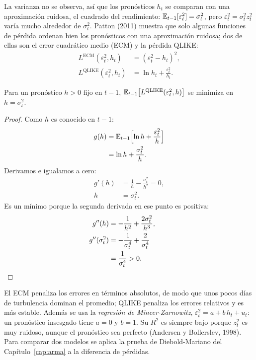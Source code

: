 La varianza no se observa, así que los pronósticos $h_t$ se comparan con una aproximación ruidosa, el cuadrado
del rendimiento: $\mathbb{E}_{t-1}[\varepsilon_t^2]=\sigma_t^2$, pero $\varepsilon_t^2=\sigma_t^2z_t^2$ varía mucho
alrededor de $\sigma_t^2$. Patton (2011) muestra que solo algunas funciones de pérdida ordenan bien los
pronósticos con una aproximación ruidosa; dos de ellas son el error cuadrático medio (ECM) y la pérdida QLIKE:
\begin{align*}
  L^{\text{ECM}}(\varepsilon_t^2,h_t)   &= (\varepsilon_t^2-h_t)^2,\\
  L^{\text{QLIKE}}(\varepsilon_t^2,h_t) &= \ln h_t+\frac{\varepsilon_t^2}{h_t}.
\end{align*}

\begin{proposicion}\label{prop:qlike}
Para un pronóstico $h>0$ fijo en $t-1$, $\mathbb{E}_{t-1}\bigl[L^{\text{QLIKE}}(\varepsilon_t^2,h)\bigr]$ se minimiza en
$h=\sigma_t^2$.
\end{proposicion}

\begin{proof}
Como $h$ es conocido en $t-1$:
\begin{align*}
  g(h) &= \mathbb{E}_{t-1}\Bigl[\ln h+\frac{\varepsilon_t^2}{h}\Bigr]\\
       &= \ln h+\frac{\sigma_t^2}{h}.
\end{align*}
Derivamos e igualamos a cero:
\begin{align*}
  g'(h) &= \frac1h-\frac{\sigma_t^2}{h^2}=0,\\
  h     &= \sigma_t^2 .
\end{align*}
Es un mínimo porque la segunda derivada en ese punto es positiva:
\begin{align*}
  g''(h) &= -\frac1{h^2}+\frac{2\sigma_t^2}{h^3},\\
  g''(\sigma_t^2) &= -\frac1{\sigma_t^4}+\frac{2}{\sigma_t^4}\\
                  &= \frac1{\sigma_t^4}>0 . && \qedhere
\end{align*}
\end{proof}

El ECM penaliza los errores en términos absolutos, de modo que unos pocos días de turbulencia dominan el
promedio; QLIKE penaliza los errores relativos y es más estable. Además se usa la \emph{regresión de
Mincer-Zarnowitz}, $\varepsilon_t^2=a+b\,h_t+u_t$: un pronóstico insesgado tiene $a=0$ y $b=1$. Su $R^2$ es
siempre bajo porque $z_t^2$ es muy ruidoso, aunque el pronóstico sea perfecto (Andersen y Bollerslev, 1998).
Para comparar dos modelos se aplica la prueba de Diebold-Mariano del Capítulo~\ref{cap:arma} a la diferencia de
pérdidas.

